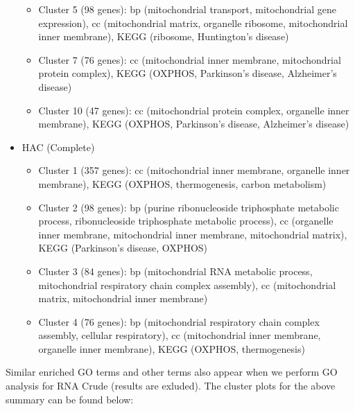 \begin{itemize}
\begin{itemize}
		\item Cluster 5 (98 genes): bp (mitochondrial transport, mitochondrial gene expression), cc (mitochondrial matrix, organelle ribosome, mitochondrial inner membrane), KEGG (ribosome, Huntington's disease)
		\item Cluster 7 (76 genes): cc (mitochondrial inner membrane, mitochondrial protein complex), KEGG (OXPHOS, Parkinson's disease, Alzheimer's disease) 
		\item Cluster 10 (47 genes): cc (mitochondrial protein complex, organelle inner membrane), KEGG (OXPHOS, Parkinson's disease, Alzheimer's disease)		
	\end{itemize}
	\item HAC (Complete)
	\begin{itemize}
		\item Cluster 1 (357 genes):  cc (mitochondrial inner membrane, organelle inner membrane), KEGG (OXPHOS, thermogenesis, carbon metabolism)
		\item Cluster 2 (98 genes): bp (purine ribonucleoside triphosphate metabolic process, ribonucleoside triphosphate metabolic process), cc (organelle inner membrane, mitochondrial inner membrane, mitochondrial matrix), KEGG (Parkinson's disease, OXPHOS)
		\item Cluster 3 (84 genes): bp (mitochondrial RNA metabolic process, mitochondrial respiratory chain complex assembly), cc (mitochondrial matrix, mitochondrial inner membrane)
		\item Cluster 4 (76 genes): bp (mitochondrial respiratory chain complex assembly, cellular respiratory), cc (mitochondrial inner membrane, organelle inner membrane), KEGG (OXPHOS, thermogenesis)
	\end{itemize}
		
\end{itemize}

Similar enriched GO terms and other terms also appear when we perform GO analysis for RNA Crude (results are exluded). The cluster plots for the above summary can be found below:


